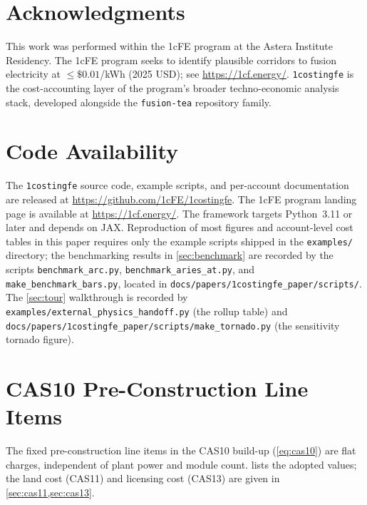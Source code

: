 \documentclass{article}
\begin{document}
\section*{Acknowledgments}

This work was performed within the 1cFE program at the Astera
Institute Residency. The 1cFE program seeks to identify plausible
corridors to fusion electricity at $\le \$0.01$/kWh (2025 USD); see
\url{https://1cf.energy/}. \texttt{1costingfe} is the cost-accounting
layer of the program's broader techno-economic analysis stack,
developed alongside the \texttt{fusion-tea} repository family.

\section{Code Availability}
\label{sec:code-availability}

The \texttt{1costingfe} source code, example scripts, and per-account
documentation are released at
\url{https://github.com/1cFE/1costingfe}. The 1cFE program landing
page is available at \url{https://1cf.energy/}. The framework targets
Python~3.11 or later and depends on JAX. Reproduction of most figures
and account-level cost tables in this paper requires only the example
scripts shipped in the \texttt{examples/} directory; the benchmarking
results in \cref{sec:benchmark} are recorded by the scripts
\texttt{benchmark\_arc.py}, \texttt{benchmark\_aries\_at.py}, and
\texttt{make\_benchmark\_bars.py}, located in
\texttt{docs/papers/1costingfe\_paper/scripts/}.
The \cref{sec:tour} walkthrough is recorded by
\texttt{examples/external\_physics\_handoff.py} (the rollup table)
and \texttt{docs/papers/1costingfe\_paper/scripts/make\_tornado.py}
(the sensitivity tornado figure).



\appendix

\section{CAS10 Pre-Construction Line Items}
\label{app:cas10}

The fixed pre-construction line items in the CAS10 build-up
(\cref{eq:cas10}) are flat charges, independent of plant power and module
count.  lists the adopted values; the land cost
(CAS11) and licensing cost (CAS13) are given in \cref{sec:cas11,sec:cas13}.
\end{document}
